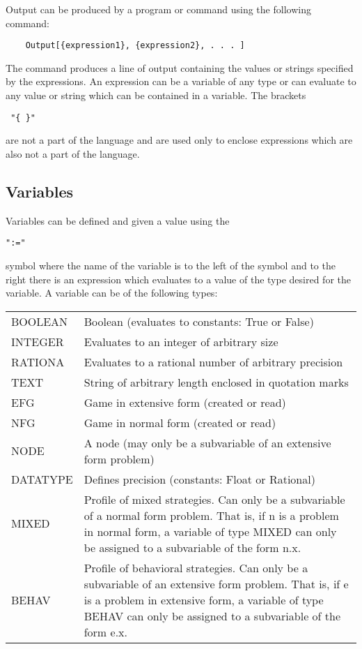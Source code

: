 Output can be produced by a program or command using the following command:

\begin{verbatim}
	Output[{expression1}, {expression2}, . . . ]
\end{verbatim}

The command produces a line of output containing the values or strings 
specified by the expressions.  An expression can be a variable of any type or 
can evaluate to any value or string which can be contained in a variable.  The 
brackets \begin{verbatim} "{ }" \end{verbatim} are not a part of the
language and are used only to enclose expressions which are also not a
part of the language.

\subsection*{Variables}

Variables can be defined and given a value using the \begin{verbatim}
":=" \end{verbatim} symbol where the name
of the variable is to the left of the symbol and to the right there is an
expression which evaluates to a value of the type desired for the variable.
A variable can be of the following types:

\medskip

\begin{tabular}{lp{}}
BOOLEAN & Boolean (evaluates to constants:  True or False)\\
INTEGER & Evaluates to an integer of arbitrary size \\
RATIONA & Evaluates to a rational number of arbitrary precision\\
TEXT	& String of arbitrary length enclosed in quotation marks\\
EFG	& Game in extensive form (created or read)\\
NFG	& Game in normal form (created or read)\\
NODE	& A node (may only be a subvariable of an extensive form
problem) \\
DATATYPE & Defines precision (constants:  Float or Rational) \\
MIXED	& Profile of mixed strategies.  Can only be a subvariable of a
normal form problem.  That is, if n is a problem in normal form, a
variable of type MIXED can only be assigned to a subvariable of the
form n.x.\\
BEHAV	& Profile of behavioral strategies.  Can only be a subvariable
of an extensive form problem.  That is, if e is a problem in extensive
form, a variable of type BEHAV can only be assigned to a subvariable
of the form e.x. \\
\end{tabular}

